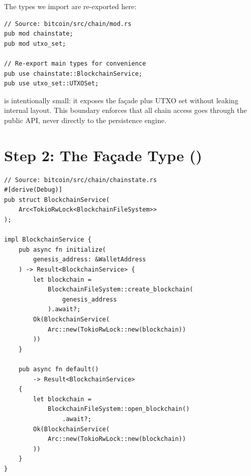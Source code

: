 The types we import are re-exported here:

\begin{listing}[htbp]
\caption{Chain module exports (public boundary)}
\label{lst:ch09-2-1}
\begin{verbatim}
// Source: bitcoin/src/chain/mod.rs
pub mod chainstate;
pub mod utxo_set;

// Re-export main types for convenience
pub use chainstate::BlockchainService;
pub use utxo_set::UTXOSet;
\end{verbatim}
\end{listing}

\begin{notebox}
 is intentionally small: it exposes the façade plus UTXO set without leaking internal layout. This boundary enforces that all chain access goes through the public API, never directly to the persistence engine.
\end{notebox}

\section{Step 2: The Façade Type ()}
\label{sec:ch09-2-step2}

\begin{listing}[H]
\caption{ façade structure}
\label{lst:ch09-2-2}
\begin{verbatim}
// Source: bitcoin/src/chain/chainstate.rs
#[derive(Debug)]
pub struct BlockchainService(
    Arc<TokioRwLock<BlockchainFileSystem>>
);

impl BlockchainService {
    pub async fn initialize(
        genesis_address: &WalletAddress
    ) -> Result<BlockchainService> {
        let blockchain =
            BlockchainFileSystem::create_blockchain(
                genesis_address
            ).await?;
        Ok(BlockchainService(
            Arc::new(TokioRwLock::new(blockchain))
        ))
    }

    pub async fn default()
        -> Result<BlockchainService>
    {
        let blockchain =
            BlockchainFileSystem::open_blockchain()
                .await?;
        Ok(BlockchainService(
            Arc::new(TokioRwLock::new(blockchain))
        ))
    }
}
\end{verbatim}
\end{listing}

